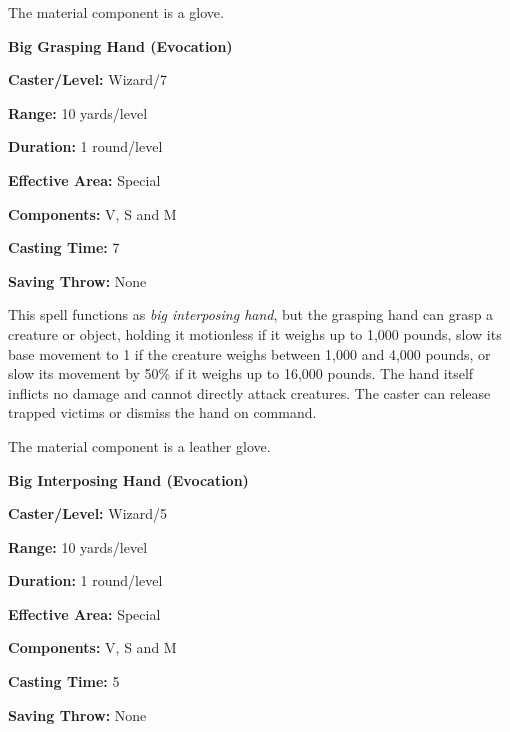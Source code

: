 \begin{multicols}{2}
The material component is a glove.

\vspace{1em}

\noindent
\begin{minipage}{\columnwidth}

\noindent \textbf{Big Grasping Hand (Evocation)}

\noindent \textbf{Caster/Level:} Wizard/7

\noindent \textbf{Range:} 10 yards/level

\noindent \textbf{Duration:} 1 round/level

\noindent \textbf{Effective Area:} Special

\noindent \textbf{Components:} V, S and M

\noindent \textbf{Casting Time:} 7

\noindent \textbf{Saving Throw:} None

\end{minipage}

This spell functions as \textit{big interposing hand}, but the grasping hand can grasp a creature or object, holding it motionless if it weighs up to 1,000 pounds, slow its base movement to 1 if the creature weighs between 1,000 and 4,000 pounds, or slow its movement by 50\% if it weighs up to 16,000 pounds.  The hand itself inflicts no damage and cannot directly attack creatures.  The caster can release trapped victims or dismiss the hand on command.

The material component is a leather glove.

\vspace{1em}

\noindent
\begin{minipage}{\columnwidth}

\noindent \textbf{Big Interposing Hand (Evocation)}

\noindent \textbf{Caster/Level:} Wizard/5

\noindent \textbf{Range:} 10 yards/level

\noindent \textbf{Duration:} 1 round/level

\noindent \textbf{Effective Area:} Special

\noindent \textbf{Components:} V, S and M

\noindent \textbf{Casting Time:} 5

\noindent \textbf{Saving Throw:} None

\end{minipage}


\end{multicols}
